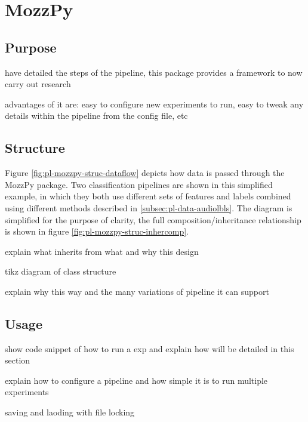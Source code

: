 \section{MozzPy}
\label{sec:pl-mozzpy}
    
    \subsection{Purpose}
    \label{subsec:pl-mozzpy-purp}
        \begin{sitemize}
            \item{have detailed the steps of the pipeline, this package provides a framework to now carry out research}
            \item{advantages of it are: easy to configure new experiments to run, easy to tweak any details within the pipeline from the config file, etc}
        \end{sitemize}
    
    \subsection{Structure}
    \label{subsec:pl-mozzpy-struc}
        
        
        Figure \ref{fig:pl-mozzpy-struc-dataflow} depicts how data is passed through the MozzPy package. Two classification pipelines are shown in this simplified example, in which they both use different sets of features and labels combined using different methods described in \ref{subsec:pl-data-audiolbls}. The diagram is simplified for the purpose of clarity, the full composition/inheritance relationship is shown in figure \ref{fig:pl-mozzpy-struc-inhercomp}.
        
        
        
        explain what inherits from what and why this design
    
        \begin{sitemize}
            \item{tikz diagram of class structure}
            \item{explain why this way and the many variations of pipeline it can support}
        \end{sitemize}
    
    \subsection{Usage}
    \label{subsec:pl-mozzpy-usage}
        \begin{sitemize}
            \item{show code snippet of how to run a exp and explain how will be detailed in this section}
            \item{explain how to configure a pipeline and how simple it is to run multiple experiments}
            \item{saving and laoding with file locking}
        \end{sitemize}
   
